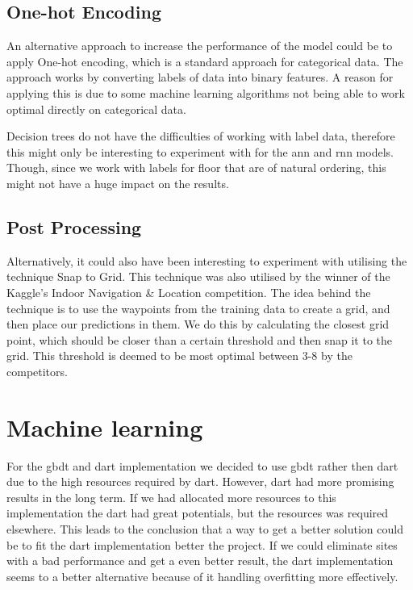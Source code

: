\subsection{One-hot Encoding}
An alternative approach to increase the performance of the model could be to apply One-hot encoding, which is a standard approach for categorical data. The approach works by converting labels of data into binary features. A reason for applying this is due to some machine learning algorithms not being able to work optimal directly on categorical data.

Decision trees do not have the difficulties of working with label data, therefore this might only be interesting to experiment with for the \gls{ann} and \gls{rnn} models. Though, since we work with labels for floor that are of natural ordering, this might not have a huge impact on the results.

\subsection{Post Processing}
Alternatively, it could also have been interesting to experiment with utilising the technique Snap to Grid. This technique was also utilised by the winner of the Kaggle's Indoor Navigation \& Location competition. The idea behind the technique is to use the waypoints from the training data to create a grid, and then place our predictions in them. We do this by calculating the closest grid point, which should be closer than a certain threshold and then snap it to the grid. This threshold is deemed to be most optimal between 3-8 by the competitors.




\section{Machine learning}

For the \gls{gbdt} and \gls{dart} implementation we decided to use \gls{gbdt} rather then \gls{dart} due to the high resources required by \gls{dart}. However, \gls{dart} had more promising results in the long term. If we had allocated more resources to this implementation the \gls{dart} had great potentials, but the resources was required elsewhere. This leads to the conclusion that a way to get a better solution could be to fit the \gls{dart} implementation better the project. If we could eliminate sites with a bad performance and get a even better result, the \gls{dart} implementation seems to a better alternative because of it handling overfitting more effectively. 

